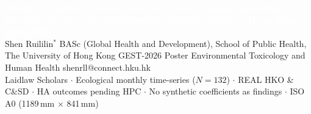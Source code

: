 \documentclass[11pt]{article}
\begin{document}
\begin{tcolorbox}[enhanced,colback=TealDark,colframe=TealDark,boxrule=0pt,arc=0pt,left=8pt,right=8pt,top=3.5pt,bottom=3pt,before skip=0pt,after skip=1.8mm,width=\linewidth]
\textcolor{white}{\bfseries\fontsize{20}{23}\selectfont
Rising hot nights, persistent cold days, and an aging population:
thermal extremes and cardiovascular hospital burden in Hong Kong, 2013--2023}\\[1pt]
\textcolor{TealSoft}{\fontsize{9.8}{11.5}\selectfont
Shen Ruililin$^{\ast}$
\quad\textbar\quad BASc (Global Health and Development), School of Public Health, The University of Hong Kong
\quad\textbar\quad GEST-2026 Poster
\quad\textbar\quad Environmental Toxicology and Human Health
\quad\textbar\quad shenrll@connect.hku.hk}\\[0.4pt]
\textcolor{TealSoft}{\fontsize{8.2}{9.8}\selectfont
Laidlaw Scholars $\cdot$ Ecological monthly time-series ($N=132$)
$\cdot$ REAL HKO \& C\&SD $\cdot$ HA outcomes pending HPC
$\cdot$ No synthetic coefficients as findings
$\cdot$ ISO A0 (1189\,mm $\times$ 841\,mm)}
\end{tcolorbox}
\end{document}
